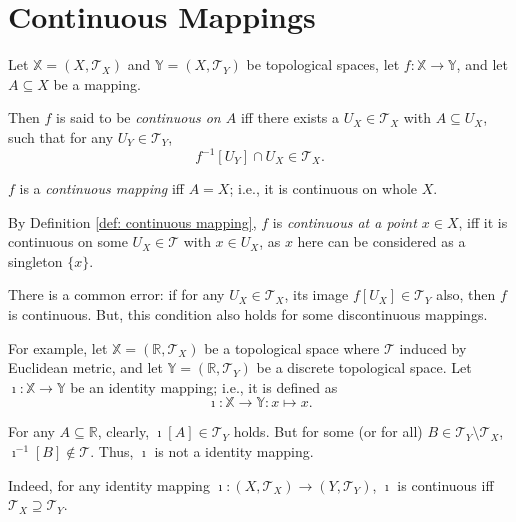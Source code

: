 \section{Continuous Mappings}


\begin{definition}
	\label{def: continuous mapping}
	Let $\mathbb X = (X, \mathcal T_X)$ and $\mathbb Y = (X, \mathcal T_Y)$ be topological spaces, let $f: \mathbb X \to \mathbb Y$, and let $A \subseteq X$ be a mapping.
	
	Then $f$ is said to be \textit{continuous on $A$} iff there exists a $U_X \in \mathcal T_X$ with $A \subseteq U_X$, such that for any $U_Y \in \mathcal T_Y$,
	$$
	f^{-1}[U_Y] \cap U_X \in \mathcal T_X.
	$$
	
	$f$ is a \textit{continuous mapping} iff $A = X$; i.e., it is continuous on whole $X$.
\end{definition}


\begin{note}
	By Definition \ref{def: continuous mapping}, $f$ is \textit{continuous at a point $x \in X$}, iff it is continuous on some $U_X \in \mathcal T$ with $x \in U_X$, as $x$ here can be considered as a singleton $\{x\}$.
\end{note}


\begin{note}
	There is a common error: if for any $U_X \in \mathcal T_X$, its image $f[U_X] \in \mathcal T_Y$ also, then $f$ is continuous. But, this condition also holds for some discontinuous mappings.
	
	For example, let $\mathbb X = (\mathbb R, \mathcal T_X)$ be a topological space where $\mathcal T$ induced by Euclidean metric, and let $\mathbb Y = (\mathbb R, \mathcal T_Y)$ be a discrete topological space. Let $\imath: \mathbb X \to \mathbb Y$ be an identity mapping; i.e., it is defined as
	$$
	\imath: \mathbb X \to \mathbb Y : x \mapsto x.
	$$
	
	For any $A \subseteq \mathbb R$, clearly, $\imath[A] \in \mathcal T_Y$ holds. But for some (or for all) $B \in \mathcal T_Y \setminus \mathcal T_X$, $\imath^{-1}[B] \notin \mathcal T$. Thus, $\imath$ is not a identity mapping.
	
	Indeed, for any identity mapping $\imath: (X, \mathcal T_X) \to (Y, \mathcal T_Y)$, $\imath$ is continuous iff $\mathcal T_X \supseteq \mathcal T_Y$.
\end{note}


